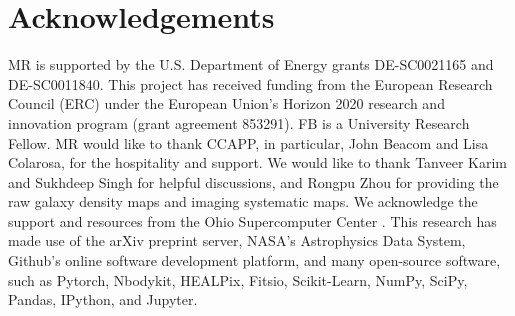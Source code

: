 \section*{Acknowledgements}
MR is supported by the U.S. Department of Energy grants DE-SC0021165 and DE-SC0011840. This project has received funding from the European Research Council (ERC) under the European Union’s Horizon 2020 research and innovation program (grant agreement 853291). FB is a University Research Fellow. MR would like to thank CCAPP, in particular, John Beacom and Lisa Colarosa, for the hospitality and support. We would like to thank Tanveer Karim and Sukhdeep Singh for helpful discussions, and Rongpu Zhou for providing the raw galaxy density maps and imaging systematic maps. We acknowledge the support and resources from the Ohio Supercomputer Center \citep[OSC;][]{OhioSupercomputerCenter1987}. This research has made use of the arXiv preprint server, NASA’s Astrophysics Data System, Github's online software development platform, and many open-source software, such as Pytorch, Nbodykit, HEALPix, Fitsio, Scikit-Learn, NumPy, SciPy, Pandas, IPython, and Jupyter. 


